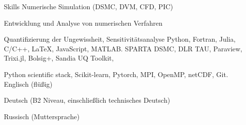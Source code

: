 
\begin{rubric}{Skills}
\entry*[Kompetenzen]
    Numerische Simulation (DSMC, DVM, CFD, PIC)
    \par Entwicklung und Analyse von numerischen Verfahren
    \par Quantifizierung der Ungewissheit, Sensitivit\"{a}tsanalyse
	Python, Fortran, Julia, C/C++, \LaTeX, JavaScript, MATLAB.
\entry*[Werkzeuge]
	   SPARTA DSMC, DLR TAU, Paraview, Trixi.jl, Bolsig+, Sandia UQ Toolkit, 
        \par Python scientific stack, Scikit-learn, Pytorch, MPI, OpenMP, netCDF, Git.
\entry*[Sprachen]
	Englisch (fl\"{u}{\ss}ig)
    \par Deutsch (B2 Niveau, einschließlich technisches Deutsch)
    \par Russisch (Muttersprache)
\end{rubric}
